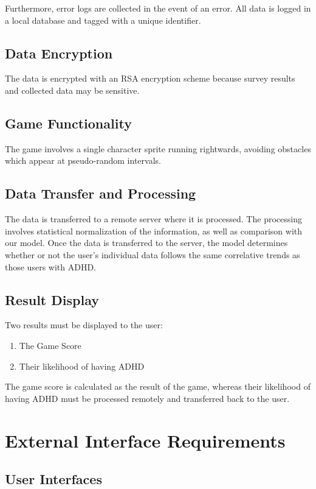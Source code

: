 \documentclass[a4wide]{article}
\begin{document}
Furthermore, error logs are collected in the event of an error. All data is logged in a local database and tagged with a unique identifier.

\subsection{Data Encryption}
The data is encrypted with an RSA encryption scheme because survey results and collected data may be sensitive.

\subsection{Game Functionality}
The game involves a single character sprite running rightwards, avoiding obstacles which appear at pseudo-random intervals.

\subsection{Data Transfer and Processing}
The data is transferred to a remote server where it is processed. The processing involves statistical normalization of the information, as well as comparison with our model. Once the data is transferred to the server, the model determines whether or not the user's individual data follows the same correlative trends as those users with ADHD. 

\subsection{Result Display}
Two results must be displayed to the user:
\begin{enumerate}
\item The Game Score
\item Their likelihood of having ADHD
\end{enumerate}
The game score is calculated as the result of the game, whereas their likelihood of having ADHD must be processed remotely and transferred back to the user. 

\section{External Interface Requirements}

\subsection{User Interfaces}
\end{document}
